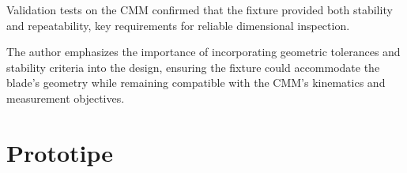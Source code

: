 Validation tests on the CMM confirmed that the fixture provided both stability and repeatability, key requirements for reliable dimensional inspection. 

The author emphasizes the importance of incorporating geometric tolerances and stability criteria into the design, ensuring the fixture could accommodate the blade's geometry while remaining compatible with the CMM's kinematics and measurement objectives.


\section{Prototipe}
\label{sec:proto}